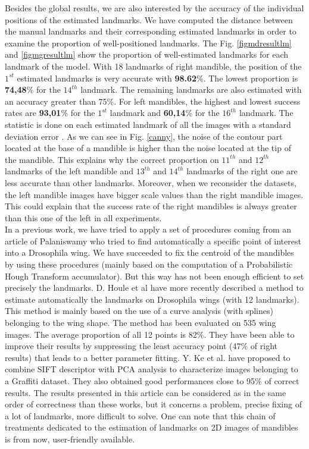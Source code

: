 \documentclass[twoside,twocolumn,10pt]{article}
\begin{document}
Besides the global results, we are also interested by the accuracy of
the individual positions of the estimated landmarks.
We have computed the distance between the manual landmarks and their
corresponding estimated landmarks in order to examine the proportion
of well-positioned landmarks. The Fig. \ref{figmdresultlm} and
\ref{figmgresultlm} show the proportion of well-estimated landmarks
for each landmark of the model. With 18 landmarks of right mandible,
the position of the $1^{st}$ estimated landmarks is very accurate with
\textbf{98.62}\%. The lowest proportion is \textbf{74,48}\% for the
$14^{th}$ landmark. The remaining landmarks are also estimated with an
accuracy greater than 75\%. For left mandibles, the highest and lowest success rates are
\textbf{93,01}\% for the $1^{st}$ landmark and \textbf{60,14}\% for
the $16^{th}$ landmark. The statistic is done on each estimated
landmark of all the images with a standard deviation error
\cite{bland1996statistics}. As we can see in Fig. \ref{canny}, the
noise of the contour part located at the base of a mandible is higher
than the noise located at the tip of the mandible.
This explains why the correct proportion on $11^{th}$ and $12^{th}$
landmarks of the left mandible and $13^{th}$ and $14^{th}$ landmarks of
the right one are less accurate than other landmarks. Moreover,
when we reconsider the datasets, the left mandible images have bigger
scale values than the right mandible images. This could explain that the
success rate of the right mandibles is always greater than this one of the left
in all experiments.
\\
In  a previous work, we have tried to apply a set of procedures
coming from an article of Palaniswamy \cite{palaniswamy2010automatic} who tried to find
automatically a specific point of interest into a Drosophila wing. We
have succeeded to fix the centroid of the mandibles by using these
procedures (mainly based on the computation of a Probabilistic Hough
Transform accumulator). But this way has not been enough efficient to set
precisely the landmarks. D. Houle et al \cite{houle2003automated}
have more recently described a method to estimate automatically the
landmarks on Drosophila wings (with 12 landmarks). This method is
mainly based on the use of a curve analysis (with splines) belonging
to the wing shape. The method has been evaluated on 535 wing images.
The average proportion of all 12 points is 82\%. They have been able
to improve their results by suppressing the least accuracy point (47\%
of right results) that leads to a better parameter fitting. Y. Ke et
al. \cite{ke2004pca} have proposed to combine SIFT descriptor
with PCA analysis to characterize images belonging to a Graffiti
dataset. They also obtained good performances close to 95\% of correct
results. The results presented in this article can be considered as in
the same order of correctness than these works, but it concerns a problem, precise fixing of a
lot of landmarks, more difficult to solve. One can note that this chain of
treatments dedicated to the  estimation of landmarks on 2D images of
mandibles is from now, user-friendly available.
\end{document}
